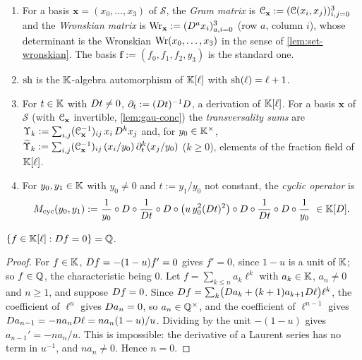 \begin{defn}
\begin{enumerate}
\item For a basis $\mathbf x=(x_0,\dots,x_3)$ of $\mathcal S$, the \emph{Gram matrix} is $\mathcal{C}_{\mathbf x}:=(\mathcal{C}(x_i,x_j))_{i,j=0}^3$ and the \emph{Wronskian matrix} is $\operatorname{Wr}_{\mathbf x}:=(D^ax_i)_{a,i=0}^3$ (row $a$, column $i$), whose determinant is the Wronskian $\operatorname{Wr}(x_0,\dots,x_3)$ in the sense of \cref{lem:set-wronskian}. The basis $\mathbf f:=(f_0,f_1,f_2,y_3)$ is the standard one.
\item $\mathrm{sh}$ is the $\mathbb{K}$-algebra automorphism of $\mathbb{K}[\ell]$ with $\mathrm{sh}(\ell)=\ell+1$.
\item For $t\in\mathbb{K}$ with $D t\neq0$, $\partial_t:=(D t)^{-1}D$, a derivation of $\mathbb{K}[\ell]$. For a basis $\mathbf x$ of $\mathcal S$ (with $\mathcal{C}_{\mathbf x}$ invertible, \cref{lem:gau-conc}) the \emph{transversality sums} are $\Upsilon_k:=\sum_{i,j}(\mathcal{C}_{\mathbf x}^{-1})_{ij}\,x_i\,D^kx_j$ and, for $y_0\in\mathbb{K}^\times$, $\widetilde\Upsilon_k:=\sum_{i,j}(\mathcal{C}_{\mathbf x}^{-1})_{ij}\,(x_i/y_0)\,\partial_t^k(x_j/y_0)$ ($k\geq0$), elements of the fraction field of $\mathbb{K}[\ell]$.
\item For $y_0,y_1\in\mathbb{K}$ with $y_0\neq0$ and $t:=y_1/y_0$ not constant, the \emph{cyclic operator} is
\begin{equation}
\label{eq:gau-Mcyc}
M_{\mathrm{cyc}}(y_0,y_1):=\frac1{y_0}\circ D\circ\frac1{D t}\circ D\circ\bigl(u\,y_0^2(D t)^2\bigr)\circ D\circ\frac1{D t}\circ D\circ\frac1{y_0}\ \in\mathbb{K}[D].
\end{equation}
\end{enumerate}
\end{defn}

\begin{lem}
\label{lem:gau-const}
$\{f\in\mathbb{K}[\ell]:D f=0\}=\mathbb{Q}$.
\end{lem}

\begin{proof}
For $f\in\mathbb{K}$, $D f=-(1-u)f'=0$ gives $f'=0$, since $1-u$ is a unit of $\mathbb{K}$; so $f\in\mathbb{Q}$, the characteristic being $0$. Let $f=\sum_{k\leq n}a_k\ell^k$ with $a_k\in\mathbb{K}$, $a_n\neq0$ and $n\geq1$, and suppose $D f=0$. Since $D f=\sum_k\bigl(D a_k+(k+1)a_{k+1}D\ell\bigr)\ell^k$, the coefficient of $\ell^n$ gives $D a_n=0$, so $a_n\in\mathbb{Q}^\times$, and the coefficient of $\ell^{n-1}$ gives $D a_{n-1}=-na_nD\ell=na_n(1-u)/u$. Dividing by the unit $-(1-u)$ gives $a_{n-1}'=-na_n/u$. This is impossible: the derivative of a Laurent series has no term in $u^{-1}$, and $na_n\neq0$. Hence $n=0$.
\end{proof}

